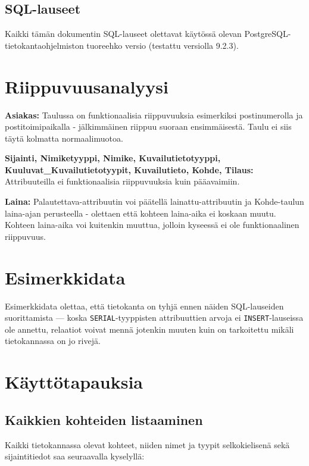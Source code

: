 \documentclass{article}
\let\stdsection\section
\renewcommand\section{\newpage\stdsection}
\begin{document}
\subsection{SQL-lauseet}

Kaikki tämän dokumentin SQL-lauseet olettavat käytössä olevan PostgreSQL-tietokantaohjelmiston tuoreehko versio (testattu versiolla 9.2.3).



\section{Riippuvuusanalyysi}

\textbf{Asiakas:} Taulussa on funktionaalisia riippuvuuksia esimerkiksi postinumerolla ja postitoimipaikalla - jälkimmäinen riippuu suoraan ensimmäisestä. Taulu ei siis täytä kolmatta normaalimuotoa.

\textbf{Sijainti, Nimiketyyppi, Nimike, Kuvailutietotyyppi, Kuuluvat\_\-Kuvailutietotyypit, Kuvailutieto, Kohde, Tilaus:} Attribuuteilla ei funktionaalisia riippuvuuksia kuin pääavaimiin.

\textbf{Laina:} Palautettava-attribuutin voi päätellä lainattu-attribuutin ja Kohde-taulun laina-ajan perusteella - olettaen että kohteen laina-aika ei koskaan muutu. Kohteen laina-aika voi kuitenkin muuttua, jolloin kyseessä ei ole funktionaalinen riippuvuus.

\section{Esimerkkidata}

Esimerkkidata olettaa, että tietokanta on tyhjä ennen näiden SQL-lauseiden suorittamista --- koska \verb+SERIAL+-tyyppisten attribuuttien arvoja ei \verb+INSERT+-lauseissa ole annettu, relaatiot voivat mennä jotenkin muuten kuin on tarkoitettu mikäli tietokannassa on jo rivejä.



\section{Käyttötapauksia}

\subsection{Kaikkien kohteiden listaaminen}

Kaikki tietokannassa olevat kohteet, niiden nimet ja tyypit selkokielisenä sekä sijaintitiedot saa seuraavalla kyselyllä:
\end{document}
